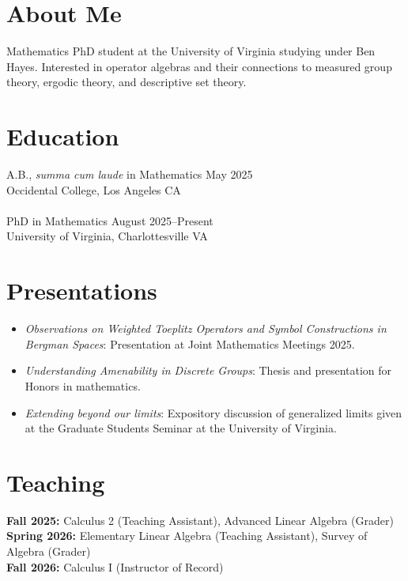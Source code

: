 \documentclass[margin, 12pt]{res} %
\begin{document}
\begin{resume}

\section{\sc About Me}
Mathematics PhD student at the University of Virginia studying under Ben Hayes. Interested in operator algebras and their connections to measured group theory, ergodic theory, and descriptive set theory.

\section{\sc Education}

A.B., \textsl{summa cum laude} in Mathematics \hfill May 2025 \\
Occidental College, Los Angeles CA\\
\vspace{6pt}\\
PhD in Mathematics \hfill August 2025--Present\\
University of Virginia, Charlottesville VA
\section{\sc Presentations}
\begin{itemize}
  \item {\sl Observations on Weighted Toeplitz Operators and Symbol Constructions in Bergman Spaces}: Presentation at Joint Mathematics Meetings 2025.
  \item {\sl Understanding Amenability in Discrete Groups}: Thesis and presentation for Honors in mathematics.
  \item {\sl Extending beyond our limits}: Expository discussion of generalized limits given at the Graduate Students Seminar at the University of Virginia.
\end{itemize}
\section{\sc Teaching}%
\textbf{Fall 2025:} Calculus 2 (Teaching Assistant), Advanced Linear Algebra (Grader)\\
\textbf{Spring 2026:} Elementary Linear Algebra (Teaching Assistant), Survey of Algebra (Grader)\\
\textbf{Fall 2026:} Calculus I (Instructor of Record)
\end{resume}
\end{document}
